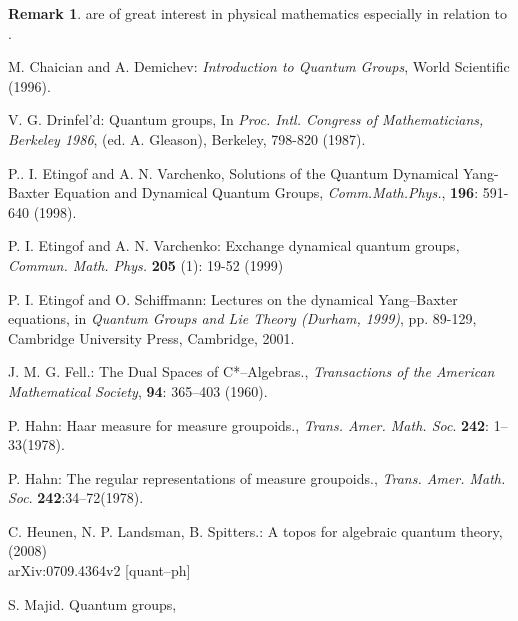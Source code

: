 \documentclass[12pt]{article}
\theoremstyle{plain}
\theoremstyle{definition}
\newtheorem{remark}{Remark}[section]
\numberwithin{equation}{section}
\newcommand{\<}{{\langle}}
\begin{document}
\begin{remark}
  are of great interest in physical mathematics
especially in relation to .
\end{remark}

\begin{thebibliography}{9}

M. Chaician and A. Demichev: \emph{Introduction to Quantum Groups}, World Scientific (1996).

V. G. Drinfel'd: Quantum groups, In \emph{Proc. Intl. Congress of
Mathematicians, Berkeley 1986}, (ed. A. Gleason), Berkeley, 798-820 (1987).


P.. I. Etingof and A. N. Varchenko, Solutions of the Quantum Dynamical Yang-Baxter Equation and Dynamical Quantum Groups, \emph{Comm.Math.Phys.}, \textbf{196}: 591-640 (1998).

P. I. Etingof and A. N. Varchenko: Exchange dynamical quantum groups, \emph{Commun. Math. Phys.} \textbf{205} (1): 19-52 (1999)

P. I. Etingof and O. Schiffmann: Lectures on the dynamical Yang--Baxter equations, in \emph{Quantum Groups and Lie Theory (Durham, 1999)}, pp. 89-129, Cambridge University Press, Cambridge, 2001.

J. M. G. Fell.: The Dual Spaces of C*--Algebras., \emph{Transactions of the American
Mathematical Society}, \textbf{94}: 365--403 (1960).

P. Hahn: Haar measure for measure groupoids., \textit{Trans. Amer. Math. Soc}. \textbf{242}: 1--33(1978).

P. Hahn: The regular representations of measure groupoids., \textit{Trans. Amer. Math. Soc}. \textbf{242}:34--72(1978).

C. Heunen, N. P. Landsman, B. Spitters.: A topos for algebraic quantum theory, (2008) \\
arXiv:0709.4364v2 [quant--ph]

S. Majid. Quantum groups, 

\end{thebibliography}

\end{document}
